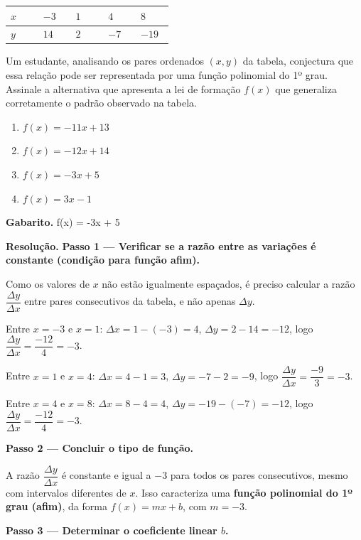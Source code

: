 \documentclass[11pt,a4paper]{article}
\begin{document}
\begin{center}
\begin{tabular}{|p{0.172\linewidth}|p{0.172\linewidth}|p{0.172\linewidth}|p{0.172\linewidth}|p{0.172\linewidth}|}
\hline
\textbf{$x$} & \textbf{$-3$} & \textbf{$1$} & \textbf{$4$} & \textbf{$8$} \\
\hline
$y$ & $14$ & $2$ & $-7$ & $-19$ \\
\hline
\end{tabular}
\end{center}

Um estudante, analisando os pares ordenados $(x,y)$ da tabela, conjectura que essa relação pode ser representada por uma função polinomial do 1º grau. Assinale a alternativa que apresenta a lei de formação $f(x)$ que generaliza corretamente o padrão observado na tabela.
\begin{enumerate}[label=(\alph*)]
\item $f(x) = -11x + 13$
\item $f(x) = -12x + 14$
\item $f(x) = -3x + 5$
\item $f(x) = 3x - 1$
\end{enumerate}

\textbf{Gabarito.} f(x) = -3x + 5

\textbf{Resolução.} \textbf{Passo 1 — Verificar se a razão entre as variações é constante (condição para função afim).}

Como os valores de $x$ não estão igualmente espaçados, é preciso calcular a razão $\dfrac{\Delta y}{\Delta x}$ entre pares consecutivos da tabela, e não apenas $\Delta y$.

Entre $x=-3$ e $x=1$: $\Delta x = 1-(-3)=4$, $\Delta y = 2-14=-12$, logo $\dfrac{\Delta y}{\Delta x}=\dfrac{-12}{4}=-3$.

Entre $x=1$ e $x=4$: $\Delta x = 4-1=3$, $\Delta y = -7-2=-9$, logo $\dfrac{\Delta y}{\Delta x}=\dfrac{-9}{3}=-3$.

Entre $x=4$ e $x=8$: $\Delta x = 8-4=4$, $\Delta y = -19-(-7)=-12$, logo $\dfrac{\Delta y}{\Delta x}=\dfrac{-12}{4}=-3$.

\textbf{Passo 2 — Concluir o tipo de função.}

A razão $\dfrac{\Delta y}{\Delta x}$ é constante e igual a $-3$ para todos os pares consecutivos, mesmo com intervalos diferentes de $x$. Isso caracteriza uma \textbf{função polinomial do 1º grau (afim)}, da forma $f(x)=mx+b$, com $m=-3$.

\textbf{Passo 3 — Determinar o coeficiente linear $b$.}
\end{document}

